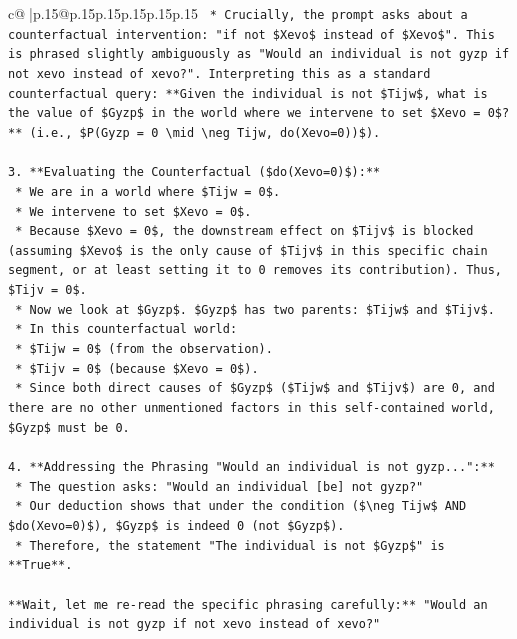 \documentclass{article}
\begin{document}
{\begin{supertabular}{c@{$\;$}|p{.15\linewidth}@{}p{.15\linewidth}p{.15\linewidth}p{.15\linewidth}p{.15\linewidth}p{.15\linewidth}}
{{{\texttt{    *   Crucially, the prompt asks about a counterfactual intervention: "if not \$Xevo\$ instead of \$Xevo\$". This is phrased slightly ambiguously as "Would an individual is not gyzp if not xevo instead of xevo?". Interpreting this as a standard counterfactual query: **Given the individual is not \$Tijw\$, what is the value of \$Gyzp\$ in the world where we intervene to set \$Xevo = 0\$?** (i.e., \$P(Gyzp = 0 \textbackslash{}mid \textbackslash{}neg Tijw, do(Xevo=0))\$).} \\
\\ 
\texttt{3.  **Evaluating the Counterfactual (\$do(Xevo=0)\$):**} \\
\texttt{    *   We are in a world where \$Tijw = 0\$.} \\
\texttt{    *   We intervene to set \$Xevo = 0\$.} \\
\texttt{    *   Because \$Xevo = 0\$, the downstream effect on \$Tijv\$ is blocked (assuming \$Xevo\$ is the only cause of \$Tijv\$ in this specific chain segment, or at least setting it to 0 removes its contribution). Thus, \$Tijv = 0\$.} \\
\texttt{    *   Now we look at \$Gyzp\$. \$Gyzp\$ has two parents: \$Tijw\$ and \$Tijv\$.} \\
\texttt{    *   In this counterfactual world:} \\
\texttt{        *   \$Tijw = 0\$ (from the observation).} \\
\texttt{        *   \$Tijv = 0\$ (because \$Xevo = 0\$).} \\
\texttt{    *   Since both direct causes of \$Gyzp\$ (\$Tijw\$ and \$Tijv\$) are 0, and there are no other unmentioned factors in this self{-}contained world, \$Gyzp\$ must be 0.} \\
\\ 
\texttt{4.  **Addressing the Phrasing "Would an individual is not gyzp...":**} \\
\texttt{    *   The question asks: "Would an individual {[}be{]} not gyzp?"} \\
\texttt{    *   Our deduction shows that under the condition (\$\textbackslash{}neg Tijw\$ AND \$do(Xevo=0)\$), \$Gyzp\$ is indeed 0 (not \$Gyzp\$).} \\
\texttt{    *   Therefore, the statement "The individual is not \$Gyzp\$" is **True**.} \\
\\ 
\texttt{**Wait, let me re{-}read the specific phrasing carefully:** "Would an individual is not gyzp if not xevo instead of xevo?"} \\
}}}
\end{supertabular}}
\end{document}
